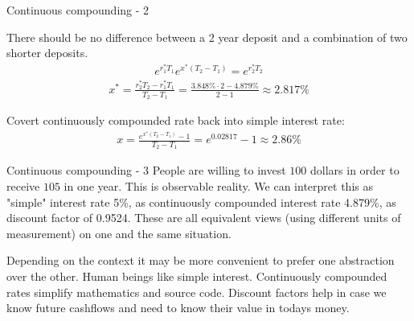 \documentclass{beamer}
\begin{document}
\begin{frame}{Continuous compounding - 2}
\centering
{}

\justifying
There should be no difference between a 2 year deposit and a combination of two shorter deposits.
\begin{align*}
e^{r_1^*T_1}e^{x^*(T_2-T_1)} = e^{r_2^*T_2}
\end{align*}
\begin{align*}
x^* = \frac{r_2^*T_2-r_1^*T_1}{T_2-T_1} = \frac{3.848\%\cdot2 - 4.879\%}{2 - 1} \approx 2.817\%
\end{align*}

Covert continuously compounded rate back into simple interest rate:
\begin{align*}
x = \frac{e^{x^*(T_2-T_1)} - 1}{T_2 - T_1} = e^{0.02817} - 1 \approx 2.86\% 
\end{align*}
\end{frame}



\begin{frame}{Continuous compounding - 3}
\justify
People are willing to invest $100$ dollars in order to receive $105$ in one year. This is observable reality. We can interpret this as "simple" interest rate 5\%, as continuously compounded interest rate 4.879\%, as discount factor of 0.9524. These are all equivalent views (using different units of measurement) on one and the same situation.

\justify 
Depending on the context it may be more convenient to prefer one abstraction over the other. Human beings like simple interest. Continuously compounded rates simplify mathematics and source code. Discount factors help in case we know future cashflows and need to know their value in todays money.
\end{frame}
\end{document}
